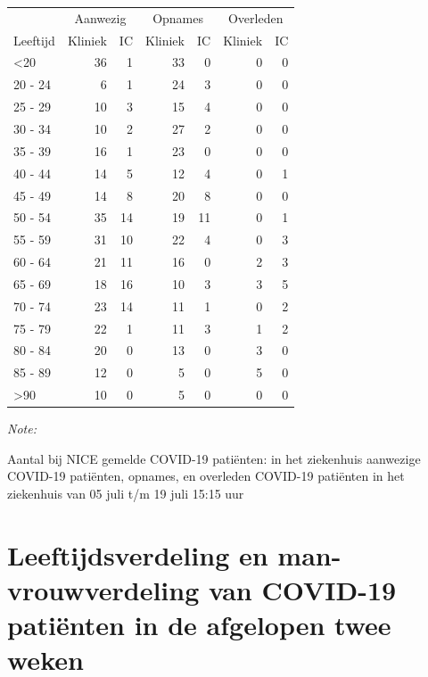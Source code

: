 \documentclass[
  english,
  man,floatsintext]{apa6}
\begin{document}
\begin{table}
\centering\begingroup\fontsize{10}{12}\selectfont

\begin{threeparttable}
\begin{tabular}{lrrrrrr}
\toprule
\multicolumn{1}{c}{ } & \multicolumn{2}{c}{Aanwezig} & \multicolumn{2}{c}{Opnames} & \multicolumn{2}{c}{Overleden} \\
\cmidrule(l{3pt}r{3pt}){2-3} \cmidrule(l{3pt}r{3pt}){4-5} \cmidrule(l{3pt}r{3pt}){6-7}
Leeftijd & Kliniek & IC & Kliniek & IC & Kliniek & IC\\
\midrule
<20 & 36 & 1 & 33 & 0 & 0 & 0\\
20 - 24 & 6 & 1 & 24 & 3 & 0 & 0\\
25 - 29 & 10 & 3 & 15 & 4 & 0 & 0\\
30 - 34 & 10 & 2 & 27 & 2 & 0 & 0\\
35 - 39 & 16 & 1 & 23 & 0 & 0 & 0\\
40 - 44 & 14 & 5 & 12 & 4 & 0 & 1\\
45 - 49 & 14 & 8 & 20 & 8 & 0 & 0\\
50 - 54 & 35 & 14 & 19 & 11 & 0 & 1\\
55 - 59 & 31 & 10 & 22 & 4 & 0 & 3\\
60 - 64 & 21 & 11 & 16 & 0 & 2 & 3\\
65 - 69 & 18 & 16 & 10 & 3 & 3 & 5\\
70 - 74 & 23 & 14 & 11 & 1 & 0 & 2\\
75 - 79 & 22 & 1 & 11 & 3 & 1 & 2\\
80 - 84 & 20 & 0 & 13 & 0 & 3 & 0\\
85 - 89 & 12 & 0 & 5 & 0 & 5 & 0\\
>90 & 10 & 0 & 5 & 0 & 0 & 0\\
\bottomrule
\end{tabular}
\begin{tablenotes}
\item \textit{Note: } 
\item Aantal bij NICE gemelde COVID-19 patiënten: in het ziekenhuis aanwezige COVID-19 patiënten, opnames, en overleden COVID-19 patiënten in het ziekenhuis van 05 juli t/m 19 juli 15:15 uur
\end{tablenotes}
\end{threeparttable}
\endgroup{}
\end{table}

\newpage

\hypertarget{leeftijdsverdeling-en-man-vrouwverdeling-van-covid-19-patiuxebnten-in-de-afgelopen-twee-weken}{%
\section{Leeftijdsverdeling en man-vrouwverdeling van COVID-19 patiënten in de afgelopen twee weken}\label{leeftijdsverdeling-en-man-vrouwverdeling-van-covid-19-patiuxebnten-in-de-afgelopen-twee-weken}}
\end{document}
